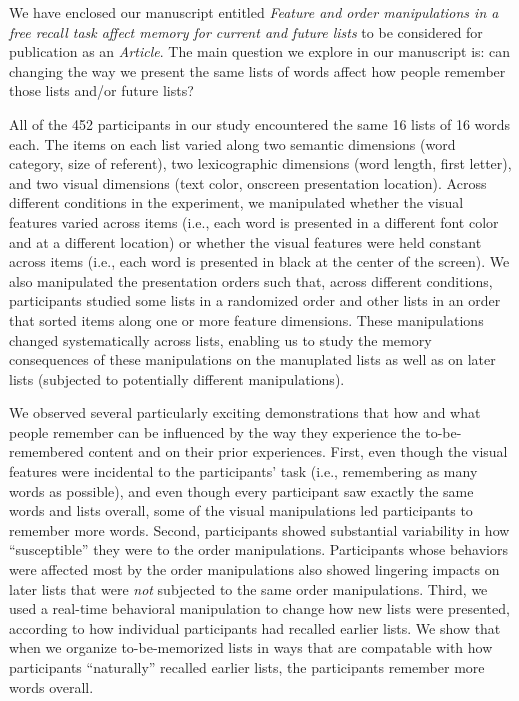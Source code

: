 \documentclass[11pt,stdletter,orderfromtodate,sigleft]{newlfm}
\newcommand{\articletype}{Article}
\newcommand{\myTitle}{Feature and order manipulations in a free recall task affect memory for current and future lists}
\begin{document}
\begin{newlfm}

  We have enclosed our manuscript entitled \textit{\myTitle} to be considered
  for publication as an \textit{\articletype}. The main question we explore in
  our manuscript is: can changing the way we present the same lists of words
  affect how people remember those lists and/or future lists?
  
  All of the 452 participants in our study encountered the same 16 lists of 16
  words each. The items on each list varied along two semantic dimensions (word
  category, size of referent), two lexicographic dimensions (word length, first
  letter), and two visual dimensions (text color, onscreen presentation
  location). Across different conditions in the experiment, we manipulated
  whether the visual features varied across items (i.e., each word is presented
  in a different font color and at a different location) or whether the visual
  features were held constant across items (i.e., each word is presented in
  black at the center of the screen). We also manipulated the presentation
  orders such that, across different conditions, participants studied some
  lists in a randomized order and other lists in an order that sorted items
  along one or more feature dimensions. These manipulations changed
  systematically across lists, enabling us to study the memory consequences of
  these manipulations on the manuplated lists as well as on later lists
  (subjected to potentially different manipulations).

  We observed several particularly exciting demonstrations that how and what
  people remember can be influenced by the way they experience the
  to-be-remembered content and on their prior experiences. First, even though
  the visual features were incidental to the participants' task (i.e.,
  remembering as many words as possible), and even though every participant saw
  exactly the same words and lists overall, some of the visual manipulations
  led participants to remember more words. Second, participants showed
  substantial variability in how ``susceptible'' they were to the order
  manipulations. Participants whose behaviors were affected most by the order
  manipulations also showed lingering impacts on later lists that were
  \textit{not} subjected to the same order manipulations. Third, we used a
  real-time behavioral manipulation to change how new lists were presented,
  according to how individual participants had recalled earlier lists. We show
  that when we organize to-be-memorized lists in ways that are compatable with
  how participants ``naturally'' recalled earlier lists, the participants
  remember more words overall.


\end{newlfm}
\end{document}
